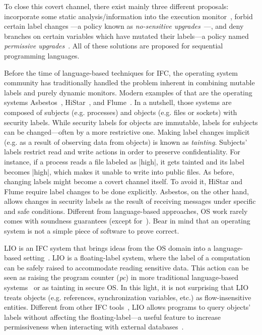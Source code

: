 To close this covert channel, there exist mainly three different proposals:
incorporate some static analysis/information into the execution
monitor~\citep{Russo:2010,stefan:lio,10.1109/SP.2013.10}, forbid certain label
changes ---a policy known as \emph{no-sensitive
  upgrades}~\citep{Austin:Flanagan:PLAS10}---, and deny branches on certain
variables which have mutated their labels---a policy named \emph{permissive
  upgrades}~\citep{Austin:Flanagan:PLAS10}. All of these solutions are proposed
for sequential programming languages.


Before the time of language-based techniques for IFC, the operating system
community has traditionally handled the problem inherent in combining mutable
labels and purely dynamic monitors. Modern examples of that are the operating
systems Asbestos~\citep{Efstathopoulos:2005}, HiStar~\citep{zeldovich:histar},
and Flume~\citep{krohn:flume}. In a nutshell, those systems are composed of
subjects (e.g. processes) and objects (e.g. files or sockets) with security
labels. While security labels for objects are immutable, labels for subjects can
be changed---often by a more restrictive one. Making label changes implicit
(e.g. as a result of observing data from objects) is known as
\emph{tainting}. Subjects' labels restrict read and write actions in order to
preserve confidentiality. For instance, if a process reads a file labeled as
|high|, it gets tainted and its label becomes |high|, which makes it unable to
write into public files. As before, changing labels might become a covert
channel itself. To avoid it, HiStar and Flume require label changes to be done
explicitly.  Asbestos, on the other hand, allows changes in security labels as
the result of receiving messages under specific and safe conditions. Different
from language-based approaches, OS work rarely comes with soundness guarantees
(except for~\citep{Krohn,seL4IF}). Bear in mind that an operating system is not
a simple piece of software to prove correct.


LIO is an IFC system that brings ideas from the OS domain into a language-based
setting~\citep{stefan:lio,stefan:addressing-covert}.  LIO is a floating-label
system, where the label of a computation can be safely raised to accommodate
reading sensitive data. This action can be seen as raising the program counter
(\emph{pc}) in more traditional language-based
systems~\citep{sabelfeld:language-based-iflow} or as tainting in secure OS.  In
this light, it is not surprising that LIO treats objects (e.g. references,
synchronization variables, etc.) as flow-insensitive entities. Different from
other IFC tools~\citep{jif,FlowCaml,Hedin13}, LIO allows programs to query
objects' labels without affecting the floating-label---a useful feature to
increase permissiveness when interacting with external databases~\citep{giffin:hails}.

